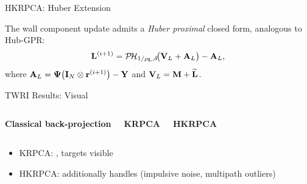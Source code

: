 \begin{frame}{HKRPCA: Huber Extension \skipbadge{}}
  \vspace{0.5em}
  \begin{shibuiproposition}
    The wall component update admits a \emph{Huber proximal} closed form,
    analogous to Hub-GPR:
    \[
      \mathbf{L}^{(i+1)}
        = \mathcal{P\!H}_{1/\rho_{\mathbf{L}},\delta}\!\bigl(
            \mathbf{V}_{L} + \mathbf{A}_{L}
          \bigr)
          - \mathbf{A}_{L},
    \]
    where
    $\mathbf{A}_{L}
       = \boldsymbol{\Psi}\bigl(\mathbf{I}_{N}\otimes\mathbf{r}^{(i+1)}\bigr)
         - \mathbf{Y}$
    and
    $\mathbf{V}_{L} = \mathbf{M} + \widetilde{\mathbf{L}}$.
  \end{shibuiproposition}

\end{frame}

\begin{frame}{TWRI Results: Visual}

  \begin{columns}[T]
      \centering
      \textbf{Classical back-projection}

      \vspace{0.3em}

      \centering
      \textbf{KRPCA}

      \vspace{0.3em}

      \centering
      \textbf{HKRPCA}

      \vspace{0.3em}
  \end{columns}

  \vspace{0.5em}
  \begin{itemize}
    \item KRPCA: , targets visible
    \item HKRPCA: additionally handles 
          (impulsive noise, multipath outliers)
  \end{itemize}

  \vspace{0.3em}

\end{frame}

